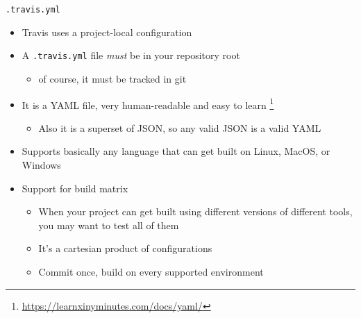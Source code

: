 \documentclass[presentation]{beamer}
\begin{document}
\begin{frame}{\texttt{.travis.yml}}
    \begin{itemize}
        \item Travis uses a project-local configuration
        \item A \texttt{.travis.yml} file \textit{must} be in your repository root
        \begin{itemize}
            \item of course, it must be tracked in git
        \end{itemize}
        \item It is a YAML file, very human-readable and easy to learn \footnote{\url{https://learnxinyminutes.com/docs/yaml/}} 
        \begin{itemize}
            \item Also it is a superset of JSON, so any valid JSON is a valid YAML
        \end{itemize}
        \item Supports basically any language that can get built on Linux, MacOS, or Windows
        \item Support for build matrix
        \begin{itemize}
            \item When your project can get built using different versions of different tools, you may want to test all of them
            \item It's a cartesian product of configurations
            \item Commit once, build on every supported environment
        \end{itemize}
    \end{itemize}
\end{frame}
\end{document}

